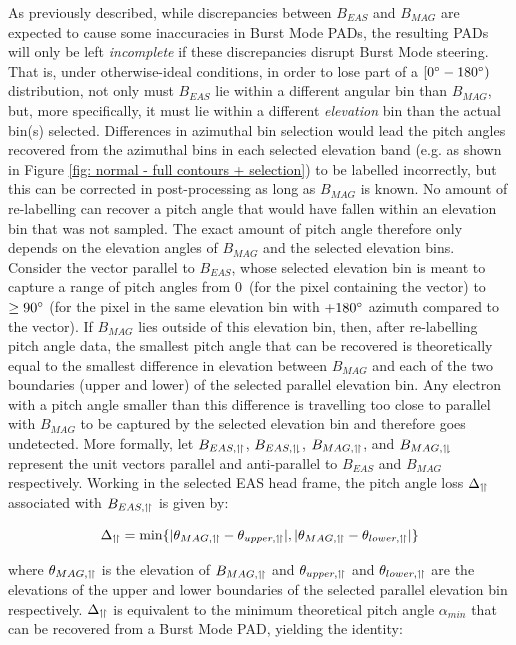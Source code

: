 As previously described, while discrepancies between \(B_{EAS}\) and \(B_{MAG}\) are expected to cause some inaccuracies in Burst Mode PADs, the resulting PADs will only be left \textit{incomplete} if these discrepancies disrupt Burst Mode steering. That is, under otherwise-ideal conditions, in order to lose part of a \([0\degree-180\degree)\) distribution, not only must \(B_{EAS}\) lie within a different angular bin than \(B_{MAG}\), but, more specifically, it must lie within a different \textit{elevation} bin than the actual bin(s) selected. Differences in azimuthal bin selection would lead the pitch angles recovered from the azimuthal bins in each selected elevation band (e.g. as shown in Figure \ref{fig: normal - full contours + selection}) to be labelled incorrectly, but this can be corrected in post-processing as long as \(B_{MAG}\) is known. No amount of re-labelling can recover a pitch angle that would have fallen within an elevation bin that was not sampled. The exact amount of pitch angle  therefore only depends on the elevation angles of \(B_{MAG}\) and the selected elevation bins. Consider the vector parallel to \(B_{EAS}\), whose selected elevation bin is meant to capture a range of pitch angles from 0\degree\ (for the pixel containing the vector) to \(\geq90\degree\) (for the pixel in the same elevation bin with \(+180\degree\) azimuth compared to the vector). If \(B_{MAG}\) lies outside of this elevation bin, then, after re-labelling pitch angle data, the smallest pitch angle that can be recovered is theoretically equal to the smallest difference in elevation between \(B_{MAG}\) and each of the two boundaries (upper and lower) of the selected parallel elevation bin. Any electron with a pitch angle smaller than this difference is travelling too close to parallel with \(B_{MAG}\) to be captured by the selected elevation bin and therefore goes undetected. More formally, let \(B_{EAS, \upharpoonleft \! \upharpoonright}\), \(B_{EAS, \upharpoonleft \! \downharpoonright}\), \(B_{MAG, \upharpoonleft \! \upharpoonright}\), and \(B_{MAG, \upharpoonleft \! \downharpoonright}\) represent the unit vectors parallel and anti-parallel to \(B_{EAS}\) and \(B_{MAG}\) respectively. Working in the selected EAS head frame, the pitch angle loss \(\Delta_{\upharpoonleft \! \upharpoonright}\) associated with \(B_{EAS, \upharpoonleft \! \upharpoonright}\) is given by:

\begin{equation} \label{eq: parallel loss}
    \Delta_{\upharpoonleft \! \upharpoonright}=\min\{|\theta_{MAG, \upharpoonleft \! \upharpoonright}-\theta_{upper, \upharpoonleft \! \upharpoonright}|, |\theta_{MAG, \upharpoonleft \! \upharpoonright}-\theta_{lower, \upharpoonleft \! \upharpoonright}|\}
\end{equation}

where \(\theta_{MAG, \upharpoonleft \! \upharpoonright}\) is the elevation of \(B_{MAG, \upharpoonleft \! \upharpoonright}\) and \(\theta_{upper, \upharpoonleft \! \upharpoonright}\) and \(\theta_{lower, \upharpoonleft \! \upharpoonright}\) are the elevations of the upper and lower boundaries of the selected parallel elevation bin respectively. \(\Delta_{\upharpoonleft \! \upharpoonright}\) is equivalent to the minimum theoretical pitch angle \(\alpha_{min}\) that can be recovered from a Burst Mode PAD, yielding the identity:


